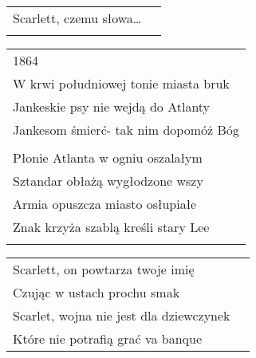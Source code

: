 \documentclass[a5paper]{article}
\begin{document}
\noindent
\begin{tabular}{@{}p{7.50cm}p{3cm}@{}}
Scarlett, czemu słowa… \\ \\
\end{tabular}

\noindent
\begin{tabular}{@{}p{10.00cm}@{}}
1864 \\
W krwi południowej tonie miasta bruk \\
Jankeskie psy nie wejdą do Atlanty \\
Jankesom śmierć- tak nim dopomóż Bóg \\ \\
 
Płonie Atlanta w ogniu oszalałym \\
Sztandar obłażą wygłodzone wszy \\
Armia opuszcza miasto osłupiałe \\
Znak krzyża szablą kreśli stary Lee \\ \\
\end{tabular}

\noindent
\begin{tabular}{@{}p{7.50cm}p{3cm}@{}}
Scarlett, on powtarza twoje imię \\
Czując w ustach prochu smak \\
Scarlet, wojna nie jest dla dziewczynek \\
Które nie potrafią grać va banque
\end{tabular}
\end{document}

